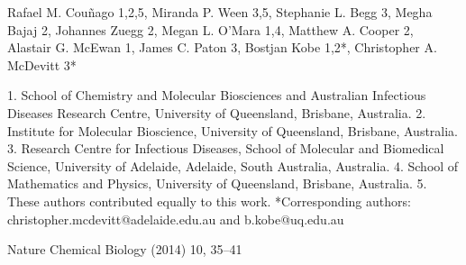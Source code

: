 Rafael M. Couñago 1,2,5, Miranda P. Ween 3,5, Stephanie L. Begg 3, Megha Bajaj 2, Johannes Zuegg 2, Megan L. O’Mara 1,4, Matthew A. Cooper 2, Alastair G. McEwan 1, James C. Paton 3, Bostjan Kobe 1,2*, Christopher A. McDevitt 3*

1. School of Chemistry and Molecular Biosciences and Australian Infectious Diseases Research Centre, University of Queensland, Brisbane, Australia.
2. Institute for Molecular Bioscience, University of Queensland, Brisbane, Australia.
3. Research Centre for Infectious Diseases, School of Molecular and Biomedical Science, University of Adelaide, Adelaide, South Australia, Australia.
4. School of Mathematics and Physics, University of Queensland, Brisbane, Australia.
5. These authors contributed equally to this work.
*Corresponding authors: christopher.mcdevitt@adelaide.edu.au and b.kobe@uq.edu.au

Nature Chemical Biology (2014) 10, 35–41
